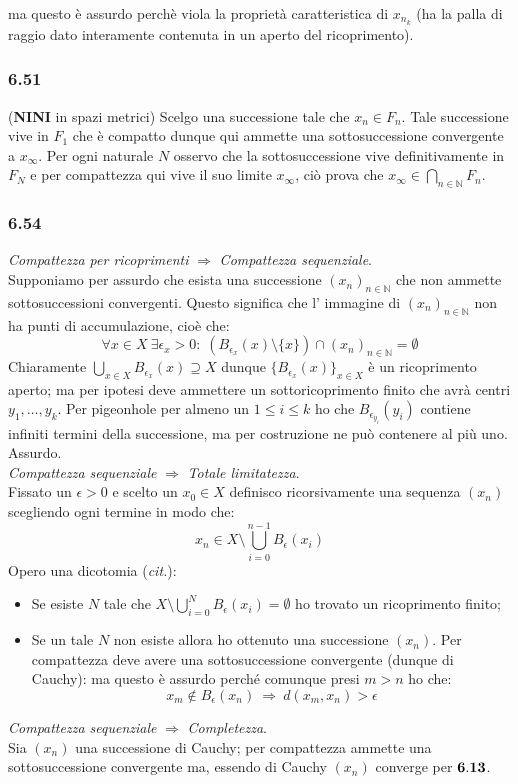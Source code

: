 \documentclass[a4paper,11pt]{article}
\newcommand{\ex}[1]{\subsubsection*{#1}}
\newcommand{\NN}{\mathbb{N}}
\newcommand{\rec}[1]{{\bf #1}}
\newcommand{\NINI}{{\bf NINI }}
\begin{document}
ma questo è assurdo perchè viola la proprietà caratteristica di $x_{n_k}$ (ha la palla di raggio dato interamente contenuta in un aperto del ricoprimento).
\ex{6.51} (\NINI in spazi metrici) Scelgo una successione tale che $x_n \in F_n$. Tale successione vive in $F_1$ che è compatto dunque qui ammette una sottosuccessione convergente a $x_{\infty}$. Per ogni naturale $N$ osservo che la sottosuccessione vive definitivamente in $F_N$ e per compattezza qui vive il suo limite $x_{\infty}$, ciò prova che $x_{\infty}\in \bigcap_{n\in \NN}F_n$.
\ex{6.54} {\it Compattezza per ricoprimenti} $\Rightarrow$ {\it Compattezza sequenziale}. \\
Supponiamo per assurdo che esista una successione $(x_n)_{n\in\NN}$ che non ammette sottosuccessioni convergenti. Questo significa che l' immagine di $(x_n)_{n\in\NN}$ non ha punti di accumulazione, cioè che:
$$ \forall x\in X\  \exists \epsilon_x > 0: \; \left( B_{\epsilon_x}(x)\setminus \{x\}\right) \cap (x_n)_{n\in\NN} = \emptyset $$
Chiaramente $\bigcup_{x\in X}B_{\epsilon_x}(x)\supseteq X$ dunque $\{B_{\epsilon_x}(x)\}_{x\in X}$ è un ricoprimento aperto; ma per ipotesi deve ammettere un sottoricoprimento finito che avrà centri $y_1,\ldots,y_k$. Per pigeonhole per almeno un $1\leq i\leq k$ ho che $B_{\epsilon_{y_i}}(y_i)$ contiene infiniti termini della successione, ma per costruzione ne può contenere al più uno. Assurdo.\\
{\it Compattezza sequenziale} $\Rightarrow$ {\it Totale limitatezza}.\\
Fissato un $\epsilon > 0$ e scelto un $x_0 \in X$ definisco ricorsivamente una sequenza $(x_n)$ scegliendo ogni termine in modo che:
$$x_{n} \in X \setminus \bigcup_{i=0}^{n-1}B_\epsilon(x_i)$$
Opero una dicotomia ({\it cit.}):
\begin{itemize}
\item Se esiste $N$ tale che $X \setminus \bigcup_{i=0}^{N}B_\epsilon(x_i) = \emptyset $ ho trovato un ricoprimento finito;
\item Se un tale $N$ non esiste allora ho ottenuto una successione $(x_n)$. Per compattezza deve avere una sottosuccessione convergente (dunque di Cauchy): ma questo è assurdo perché comunque presi $m>n$ ho che:
$$
x_m\notin B_{\epsilon}(x_n)\ \Rightarrow\ d(x_m,x_n)>\epsilon
$$
\end{itemize}
{\it Compattezza sequenziale} $\Rightarrow$ {\it Completezza}.\\
Sia $(x_n)$ una successione di Cauchy; per compattezza ammette una sottosuccessione convergente ma, essendo di Cauchy $(x_n)$ converge per $\rec{6.13}$.\\
\end{document}
